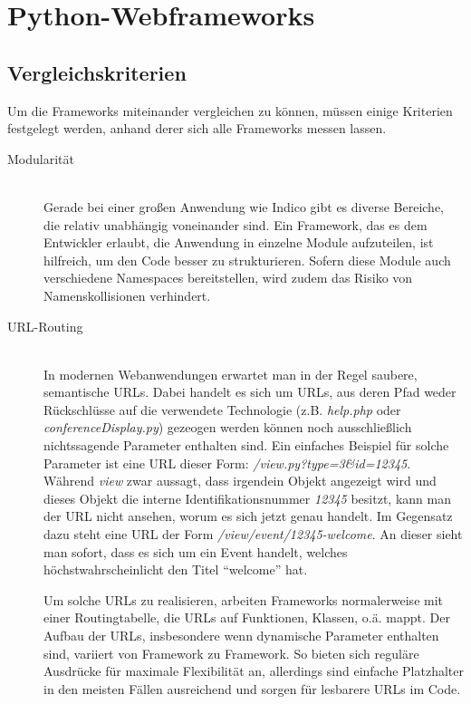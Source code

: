 \chapter{Python-Webframeworks}

\section{Vergleichskriterien}
Um die Frameworks miteinander vergleichen zu können, müssen einige Kriterien festgelegt werden,
anhand derer sich alle Frameworks messen lassen.

\begin{description}
\item[Modularität] \hfill \\
Gerade bei einer großen Anwendung wie Indico gibt es diverse Bereiche, die relativ unabhängig
voneinander sind. Ein Framework, das es dem Entwickler erlaubt, die Anwendung in einzelne Module
aufzuteilen, ist hilfreich, um den Code besser zu strukturieren. Sofern diese Module auch
verschiedene Namespaces bereitstellen, wird zudem das Risiko von Namenskollisionen verhindert.

\item[URL-Routing] \hfill \\
In modernen Webanwendungen erwartet man in der Regel saubere, semantische URLs. Dabei handelt es
sich um URLs, aus deren Pfad weder Rückschlüsse auf die verwendete Technologie (z.B. \emph{help.php}
oder \emph{conferenceDisplay.py}) gezeogen werden können noch ausschließlich nichtssagende Parameter
enthalten sind. Ein einfaches Beispiel für solche Parameter ist eine URL dieser Form:
\emph{/view.py?type=3\&id=12345}. Während \emph{view} zwar aussagt, dass irgendein Objekt angezeigt
wird und dieses Objekt die interne Identifikationsnummer \emph{12345} besitzt, kann man der URL
nicht ansehen, worum es sich jetzt genau handelt. Im Gegensatz dazu steht eine URL der Form
\emph{/view/event/12345-welcome}. An dieser sieht man sofort, dass es sich um ein Event handelt,
welches höchstwahrscheinlicht den Titel \enquote{welcome} hat.

Um solche URLs zu realisieren, arbeiten Frameworks normalerweise mit einer Routingtabelle, die URLs
auf Funktionen, Klassen, o.ä. mappt. Der Aufbau der URLs, insbesondere wenn dynamische Parameter
enthalten sind, variiert von Framework zu Framework. So bieten sich reguläre Ausdrücke für maximale
Flexibilität an, allerdings sind einfache Platzhalter in den meisten Fällen ausreichend und sorgen
für lesbarere URLs im Code.


\end{description}
